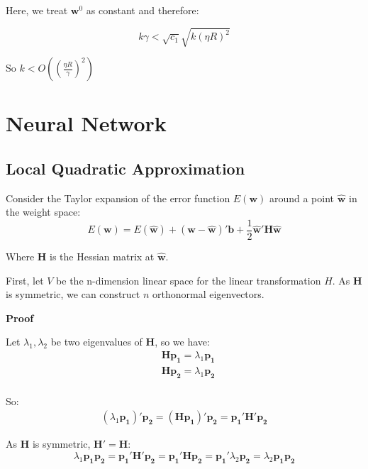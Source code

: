\documentclass{article}
\newcommand{\V}[1]{\boldsymbol{#1}}
\begin{document}
Here, we treat \(\V{w}^0\) as constant and therefore:

\begin{equation}
k\gamma < \sqrt{c_1}\sqrt{k(\eta R)^2}
\end{equation}

So \(k<O((\frac{\eta R}{\gamma})^2)\)

\section{Neural Network}
\subsection{Local Quadratic Approximation}
Consider the Taylor expansion of the error function \(E(\V{w})\) around
a point \(\hat{\V{w}}\) in the weight space:
\begin{equation}
E(\V{w})=E(\hat{\V{w}})+(\V{w}-\hat{\V{w}})'\V{b}
+\frac{1}{2}\hat{\V{w}}'\V{H}\hat{\V{w}}
\end{equation}

Where \(\V{H}\) is the Hessian matrix at \(\hat{\V{w}}\).

First, let \(V\) be the n-dimension linear space for the linear
transformation \(H\). As \(\V{H}\) is symmetric, we can construct \(n\) orthonormal eigenvectors.

\vspace{2mm}
\textbf{Proof}

Let \(\lambda_1, \lambda_2\) be two eigenvalues of \(\V{H}\), so we have:
\begin{equation}
\begin{split}
&\V{H}\V{p_1}=\lambda_1\V{p_1}\\
&\V{H}\V{p_2}=\lambda_1\V{p_2}\\
\end{split}
\end{equation}

So:
\begin{equation}
\begin{split}
(\lambda_1\V{p_1})'\V{p_2}=(\V{H}\V{p_1})'\V{p_2}
=\V{p_1}'\V{H}'\V{p_2}
\end{split}
\end{equation}

As \(\V{H}\) is symmetric, \(\V{H}'=\V{H}\):
\begin{equation}
\lambda_1\V{p_1}\V{p_2}=
\V{p_1}'\V{H}'\V{p_2}=\V{p_1}'\V{H}\V{p_2}=\V{p_1}'\lambda_2\V{p_2}
=\lambda_2\V{p_1}\V{p_2}
\end{equation}
\end{document}
